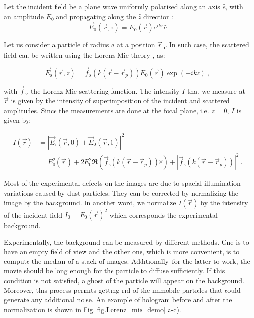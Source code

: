 Let the incident field be a plane wave uniformly polarized along an axis $ \hat{e}$, with an amplitude $E_0$ and propagating along the $\hat{z}$ direction :
\begin{equation}
	\vec{E}_0(\vec{r},z) = E_0(\vec{r}) \mathrm{e}^{ikz}\hat{e}
\end{equation}

Let us consider a particle of radius $a$ at a position $\vec{r}_\mathrm{p} $. In such case, the scattered field can be written using the Lorenz-Mie theory \cite{f_bohren_absorption_1998}, as:

\begin{equation}
	\vec{E}_\mathrm{s}(\vec{r}, z) =  \vec{f}_\mathrm{s}(k(\vec{r} - \vec{r}_p))E_0(\vec{r}) \exp \left(-ikz\right) ~,
	\label{EMie}
\end{equation} 

with $\vec{f}_\mathrm{s}$, the Lorenz-Mie scattering function. The intensity $I$ that we measure at $\vec{r}$ is given by the intensity of superimposition of the incident and scattered amplitudes. Since the measurements are done at the focal plane, i.e. $z = 0 $, $I$ is given by:

\begin{equation}
	\begin{aligned}
	I(\vec{r}) & = |\vec{E}_\mathrm{s}(\vec{r}, 0) + \vec{E}_0(\vec{r}, 0)|^2 \\
	& = E_0^2(\vec{r}) + 2 E_0^2\Re \left(\vec{f}_\mathrm{s}(k(\vec{r}- \vec{r}_p)) \hat{e}\right) + | \vec{f}_\mathrm{s}(k(\vec{r}- \vec{r}_p)) |^2 ~.
	\end{aligned}
\end{equation}

Most of the experimental defects on the images are due to spacial illumination variations caused by dust particles. They can be corrected by normalizing the image by the background. In another word, we normalize  $I(\vec{r})$ by the intensity of the incident field $I_0 = E_0(\vec{r})^2$ which corresponds the experimental background. 

Experimentally, the background can be measured by different methods. One is to have an empty field of view and the other one, which is more convenient, is to compute the median of a stack of images. Additionally, for the latter to work, the movie should be long enough for the particle to diffuse sufficiently. If this condition is not satisfied, a ghost of the particle will appear on the background. Moreover, this process permits getting rid of the immobile particles that could generate any additional noise. An example of hologram before and after the normalization is shown in Fig.\ref{fig.Lorenz_mie_demo} a-c).

